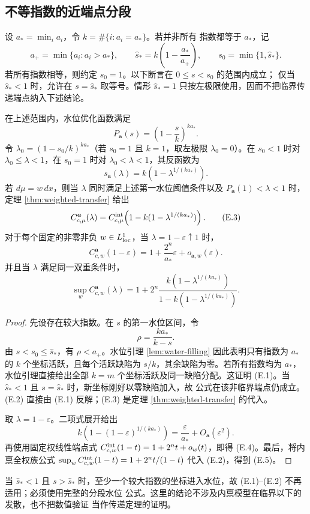 \subsection{不等指数的近端点分段}\label{subsec:weighted-endpoint}

设 $a_*=\min_i a_i$，令 $k=\#\{i:a_i=a_*\}$。若并非所有
指数都等于 $a_*$，记
\[
 a_+=\min\{a_i:a_i>a_*\},\qquad
 \widehat s_*=k\left(1-\frac{a_*}{a_+}\right),\qquad
 s_0=\min\{1,\widehat s_*\}.
\]
若所有指数相等，则约定 $s_0=1$。以下断言在 $0\le s<s_0$ 的范围内成立；
仅当 $\widehat s_*<1$ 时，允许在 $s=\widehat s_*$ 取等号。情形
$\widehat s_*=1$ 只按左极限使用，因而不把临界传递端点纳入下述结论。

\begin{theorem}[第一水位区间]\label{thm:first-water-level}
在上述范围内，水位优化函数满足
\[
 P_{\boldsymbol a}(s)=\left(1-\frac{s}{k}\right)^{ka_*}.
 \tag{E.1}
\]
令 $\lambda_0=(1-s_0/k)^{ka_*}$（若 $s_0=1$ 且 $k=1$，取左极限
\(\lambda_0=0\)）。在 $s_0<1$ 时对 $\lambda_0\le\lambda<1$，在
$s_0=1$ 时对 $\lambda_0<\lambda<1$，其反函数为
\[
 s_{\boldsymbol a}(\lambda)
 =k\left(1-\lambda^{1/(ka_*)}\right).
 \tag{E.2}
\]
若 $d\mu=w\,dx$，则当 $\lambda$ 同时满足上述第一水位阈值条件以及
$P_{\boldsymbol a}(1)<\lambda<1$ 时，定理 \ref{thm:weighted-transfer} 给出
\[
 C^{\boldsymbol a}_{c,\mu}(\lambda)
 =C^{\rm int}_{c,\mu}\!\left(1-
 k(1-\lambda^{1/(ka_*)})\right).
 \tag{E.3}
\]
对于每个固定的非零非负 $w\in L^1_{\rm loc}$，当
$\lambda=1-\varepsilon\uparrow1$ 时，
\[
 C^{\boldsymbol a}_{c,w}(1-\varepsilon)
=1+\frac{2^n}{a_*}\varepsilon+o_{\boldsymbol a,w}(\varepsilon).
 \tag{E.4}
\]
并且当 $\lambda$ 满足同一双重条件时，
\[
 \sup_w C^{\boldsymbol a}_{c,w}(\lambda)
 =1+2^n\frac{k(1-\lambda^{1/(ka_*)})}
 {1-k(1-\lambda^{1/(ka_*)})}.
 \tag{E.5}
\]
\end{theorem}

\begin{proof}
先设存在较大指数。在 $s$ 的第一水位区间，令
\[ \rho=\frac{ka_*}{k-s}. \]
由 $s<s_0\le\widehat s_*$，有 $\rho<a_+$。水位引理 \ref{lem:water-filling}
因此表明只有指数为 $a_*$ 的 $k$ 个坐标活跃，且每个活跃缺陷为
$s/k$，其余缺陷为零。若所有指数均为 $a_*$，水位引理直接给出全部
$k=m$ 个坐标活跃及同一缺陷分配。这证明 \textup{(E.1)}。当
$\widehat s_*<1$ 且 $s=\widehat s_*$ 时，新坐标刚好以零缺陷加入，故
公式在该非临界端点仍成立。
\textup{(E.2)} 直接由
\textup{(E.1)} 反解；\textup{(E.3)} 是定理
\ref{thm:weighted-transfer} 的代入。

取 $\lambda=1-\varepsilon$。二项式展开给出
\[
 k\left(1-(1-\varepsilon)^{1/(ka_*)}\right)
 =\frac{\varepsilon}{a_*}+O_{\boldsymbol a}(\varepsilon^2).
\]
再使用固定权线性端点式
$C^{\rm int}_{c,w}(1-t)=1+2^nt+o_w(t)$，即得
\textup{(E.4)}。最后，将内禀全权族公式
$\sup_wC^{\rm int}_{c,w}(1-t)=1+2^nt/(1-t)$ 代入
\textup{(E.2)}，得到 \textup{(E.5)}。
\end{proof}

\begin{remark}
当 $\widehat s_*<1$ 且 $s>\widehat s_*$ 时，至少一个较大指数的坐标进入水位，故
\textup{(E.1)}--\textup{(E.2)} 不再适用；必须使用完整的分段水位
公式。这里的结论不涉及内禀模型在临界以下的发散，也不把数值验证
当作传递定理的证明。
\end{remark}
